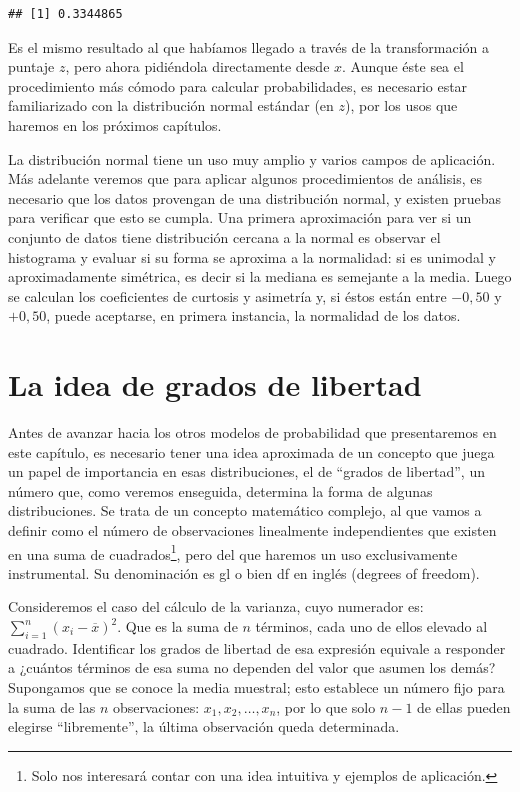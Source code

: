 \documentclass[]{book}
\let\rmarkdownfootnote\footnote%
\def\footnote{\protect\rmarkdownfootnote}
\begin{document}
\begin{verbatim}
## [1] 0.3344865
\end{verbatim}

Es el mismo resultado al que habíamos llegado a través de la
transformación a puntaje \(z\), pero ahora pidiéndola directamente desde
\(x\). Aunque éste sea el procedimiento más cómodo para calcular
probabilidades, es necesario estar familiarizado con la distribución
normal estándar (en \(z\)), por los usos que haremos en los próximos
capítulos.

La distribución normal tiene un uso muy amplio y varios campos de
aplicación. Más adelante veremos que para aplicar algunos procedimientos
de análisis, es necesario que los datos provengan de una distribución
normal, y existen pruebas para verificar que esto se cumpla. Una primera
aproximación para ver si un conjunto de datos tiene distribución cercana
a la normal es observar el histograma y evaluar si su forma se aproxima
a la normalidad: si es unimodal y aproximadamente simétrica, es decir si
la mediana es semejante a la media. Luego se calculan los coeficientes
de curtosis y asimetría y, si éstos están entre \(-0,50\) y \(+0,50\), puede aceptarse, en primera instancia, la normalidad de los datos.

\hypertarget{la-idea-de-grados-de-libertad}{%
\section{La idea de grados de libertad}\label{la-idea-de-grados-de-libertad}}

Antes de avanzar hacia los otros modelos de probabilidad que
presentaremos en este capítulo, es necesario tener una idea aproximada
de un concepto que juega un papel de importancia en esas distribuciones,
el de ``grados de libertad'', un número que, como veremos enseguida,
determina la forma de algunas distribuciones. Se trata de un concepto
matemático complejo, al que vamos a definir como el número de
observaciones linealmente independientes que existen en una suma de
cuadrados\footnote{Solo nos interesará contar con una idea intuitiva y ejemplos de
  aplicación.}, pero del que haremos un uso exclusivamente instrumental.
Su denominación es gl o bien df en inglés (degrees of freedom).

Consideremos el caso del cálculo de la varianza, cuyo numerador es:
\(\sum_{i = 1}^{n}(x_{i} - \overline{x})^{2}\). Que es la
suma de \(n\) términos, cada uno de ellos elevado al cuadrado. Identificar
los grados de libertad de esa expresión equivale a responder a ¿cuántos
términos de esa suma no dependen del valor que asumen los demás?
Supongamos que se conoce la media muestral; esto establece un número
fijo para la suma de las \(n\) observaciones: \(x_{1}, x_{2}, \ldots, x_{n}\), por lo que solo \(n-1\) de ellas pueden elegirse ``libremente'', la última
observación queda determinada.
\end{document}
